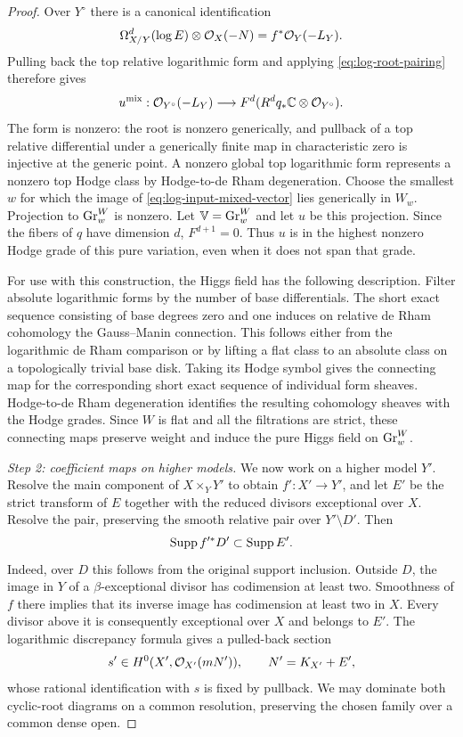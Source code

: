 \begin{proof}
Over $Y^\circ$ there is a canonical identification
\[
 \Omega^d_{X/Y}(\log E)\otimes\mathcal O_X(-N)
       =f^*\mathcal O_Y(-L_Y).
\]
Pulling back the top relative logarithmic form and applying
\eqref{eq:log-root-pairing} therefore gives
\begin{equation}\label{eq:log-input-mixed-vector}
 u^{\mathrm{mix}}:\mathcal O_{Y^\circ}(-L_Y)
   \longrightarrow F^d(R^d q_*\mathbb C\otimes\mathcal O_{Y^\circ}).
\end{equation}
The form is nonzero: the root is nonzero generically, and pullback
of a top relative differential under a generically finite map in
characteristic zero is injective at the generic point.  A nonzero
global top logarithmic form represents a nonzero top Hodge class
by Hodge-to-de Rham degeneration.  Choose the smallest $w$ for which
the image of \eqref{eq:log-input-mixed-vector} lies generically in
$W_w$.  Projection to $\operatorname{Gr}^W_w$ is nonzero.  Let $\mathbb V=\operatorname{Gr}^W_w$
and let $u$ be this projection.  Since the fibers of $q$ have
dimension $d$, $F^{d+1}=0$.  Thus $u$ is in the highest nonzero
Hodge grade of this pure variation, even when it does not span that
grade.

For use with this construction, the Higgs field has the following
description.  Filter absolute logarithmic forms by the number of
base differentials.  The short exact sequence consisting of base
degrees zero and one induces on relative de Rham cohomology the
Gauss--Manin connection.  This follows either from the logarithmic
de Rham comparison or by lifting a flat class to an absolute class
on a topologically trivial base disk.  Taking its Hodge symbol
gives the connecting map for the corresponding short exact sequence
of individual form sheaves.  Hodge-to-de Rham degeneration identifies
the resulting cohomology sheaves with the Hodge grades.  Since $W$
is flat and all the filtrations are strict, these connecting maps
preserve weight and induce the pure Higgs field on $\operatorname{Gr}^W_w$.

\smallskip\noindent\emph{Step 2: coefficient maps on higher models.}
We now work on a higher model $Y'$.  Resolve the main component of
$X\times_Y Y'$ to obtain $f':X'\to Y'$, and let $E'$ be the strict
transform of $E$ together with the reduced divisors exceptional
over $X$.  Resolve the pair, preserving the smooth relative pair
over $Y'\setminus D'$.  Then
\begin{equation}\label{eq:log-input-support}
 \operatorname{Supp} f'^*D'\subset\operatorname{Supp} E'.
\end{equation}
Indeed, over $D$ this follows from the original support inclusion.
Outside $D$, the image in $Y$ of a $\beta$-exceptional divisor has
codimension at least two.  Smoothness of $f$ there implies that its
inverse image has codimension at least two in $X$.  Every divisor
above it is consequently exceptional over $X$ and belongs to $E'$.
The logarithmic discrepancy formula gives a pulled-back section
\[
 s'\in H^0(X',\mathcal O_{X'}(mN')),
 \qquad N'=K_{X'}+E',
\]
whose rational identification with $s$ is fixed by pullback.
We may dominate both cyclic-root diagrams on a common resolution,
preserving the chosen family over a common dense open.


\end{proof}
